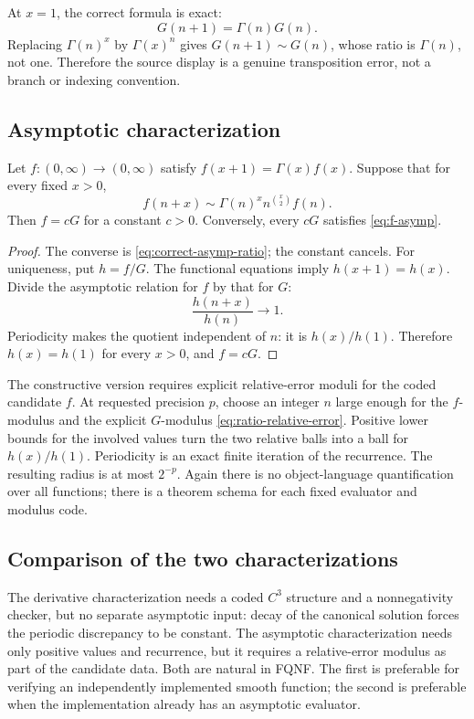 \begin{audit}
At \(x=1\), the correct formula is exact:
\[
 G(n+1)=\Gamma(n)G(n).
\]
Replacing \(\Gamma(n)^x\) by \(\Gamma(x)^n\) gives \(G(n+1)\sim G(n)\), whose
ratio is \(\Gamma(n)\), not one.  Therefore the source display is a genuine
transposition error, not a branch or indexing convention.
\end{audit}

\subsection{Asymptotic characterization}

\begin{theorem}\label{thm:corrected-characterization}
Let \(f:(0,\infty)\to(0,\infty)\) satisfy
\(f(x+1)=\Gamma(x)f(x)\).  Suppose that for every fixed \(x>0\),
\begin{equation}\label{eq:f-asymp}
 f(n+x)\sim\Gamma(n)^x n^{\binom{x}{2}}f(n).
\end{equation}
Then \(f=cG\) for a constant \(c>0\).  Conversely, every \(cG\) satisfies
\cref{eq:f-asymp}.
\end{theorem}

\begin{proof}
The converse is \cref{eq:correct-asymp-ratio}; the constant cancels.  For
uniqueness, put \(h=f/G\).  The functional equations imply
\(h(x+1)=h(x)\).  Divide the asymptotic relation for \(f\) by that for \(G\):
\[
 \frac{h(n+x)}{h(n)}\longrightarrow1.
\]
Periodicity makes the quotient independent of \(n\): it is
\(h(x)/h(1)\).  Therefore \(h(x)=h(1)\) for every \(x>0\), and \(f=cG\).
\end{proof}

The constructive version requires explicit relative-error moduli for the coded
candidate \(f\).  At requested precision \(p\), choose an integer \(n\) large
enough for the \(f\)-modulus and the explicit \(G\)-modulus
\cref{eq:ratio-relative-error}.  Positive lower bounds for the involved values
turn the two relative balls into a ball for \(h(x)/h(1)\).  Periodicity is an
exact finite iteration of the recurrence.  The resulting radius is at most
\(2^{-p}\).  Again there is no object-language quantification over all
functions; there is a theorem schema for each fixed evaluator and modulus code.

\subsection{Comparison of the two characterizations}

The derivative characterization needs a coded \(C^3\) structure and a
nonnegativity checker, but no separate asymptotic input: decay of the canonical
solution forces the periodic discrepancy to be constant.  The asymptotic
characterization needs only positive values and recurrence, but it requires a
relative-error modulus as part of the candidate data.  Both are natural in
FQNF.  The first is preferable for verifying an independently implemented
smooth function; the second is preferable when the implementation already has
an asymptotic evaluator.
